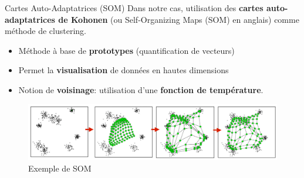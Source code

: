 \documentclass[hyperref={pdfpagelabels=false}]{beamer}
\begin{document}
        \begin{frame}{Cartes Auto-Adaptatrices (SOM)}
            Dans notre cas, utilisation des \textbf{cartes auto-adaptatrices de 
            Kohonen} (ou Self-Organizing Maps (SOM) en anglais) comme méthode de 
            clustering.
            \begin{itemize}
                \item Méthode à base de \textbf{prototypes} (quantification de 
                    vecteurs)
                \item Permet la \textbf{visualisation} de données en hautes 
                    dimensions
                \item Notion de \textbf{voisinage}: utilisation d'une 
                    \textbf{fonction de température}.
            \end{itemize}

            \begin{figure}[b]
                \centering
                \includegraphics[scale=.43]{SOM2}
                \caption{Exemple de SOM}
            \end{figure}
        \end{frame}
\end{document}
